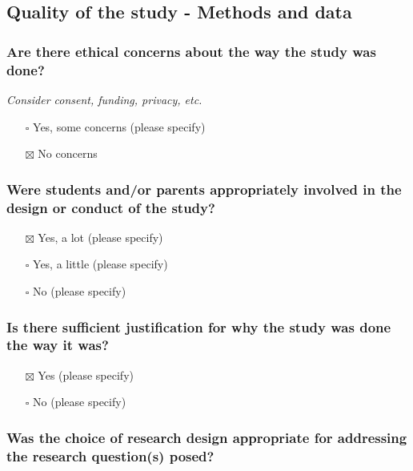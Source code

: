 \documentclass[
  doc, a4paper]{apa7}
\providecommand{\tightlist}{%
  \setlength{\itemsep}{0pt}\setlength{\parskip}{0pt}}
\begin{document}
\subsection{Quality of the study - Methods and data}\label{quality-of-the-study---methods-and-data}

\subsubsection{Are there ethical concerns about the way the study was done?}\label{are-there-ethical-concerns-about-the-way-the-study-was-done}

\emph{Consider consent, funding, privacy, etc.}

\begin{itemize}
\tightlist
\item[$\square$]
  Yes, some concerns (please specify)
\item[$\boxtimes$]
  No concerns
\end{itemize}

\subsubsection{Were students and/or parents appropriately involved in the design or conduct of the study?}\label{were-students-andor-parents-appropriately-involved-in-the-design-or-conduct-of-the-study}

\begin{itemize}
\tightlist
\item[$\boxtimes$]
  Yes, a lot (please specify)
\item[$\square$]
  Yes, a little (please specify)
\item[$\square$]
  No (please specify)
\end{itemize}

\subsubsection{Is there sufficient justification for why the study was done the way it was?}\label{is-there-sufficient-justification-for-why-the-study-was-done-the-way-it-was}

\begin{itemize}
\tightlist
\item[$\boxtimes$]
  Yes (please specify)
\item[$\square$]
  No (please specify)
\end{itemize}

\subsubsection{Was the choice of research design appropriate for addressing the research question(s) posed?}\label{was-the-choice-of-research-design-appropriate-for-addressing-the-research-questions-posed}
\end{document}

